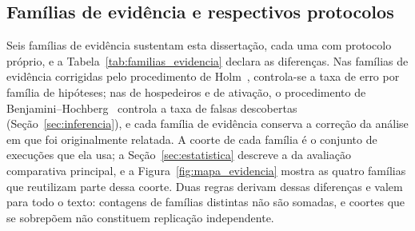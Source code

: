 %

\subsection{Famílias de evidência e respectivos protocolos}
\label{sec:familias}

Seis famílias de evidência sustentam esta dissertação, cada uma com protocolo próprio, e a Tabela~\ref{tab:familias_evidencia} declara as diferenças. Nas famílias de evidência corrigidas pelo procedimento de Holm~\cite{holm1979simple}, controla-se a taxa de erro por família de hipóteses; nas de hospedeiros e de ativação, o procedimento de Benjamini--Hochberg~\cite{benjamini1995controlling} controla a taxa de falsas descobertas (Seção~\ref{sec:inferencia}), e cada família de evidência conserva a correção da análise em que foi originalmente relatada. A coorte de cada família é o conjunto de execuções que ela usa; a Seção~\ref{sec:estatistica} descreve a da avaliação comparativa principal, e a Figura~\ref{fig:mapa_evidencia} mostra as quatro famílias que reutilizam parte dessa coorte. Duas regras derivam dessas diferenças e valem para todo o texto: contagens de famílias distintas não são somadas, e coortes que se sobrepõem não constituem replicação independente.

